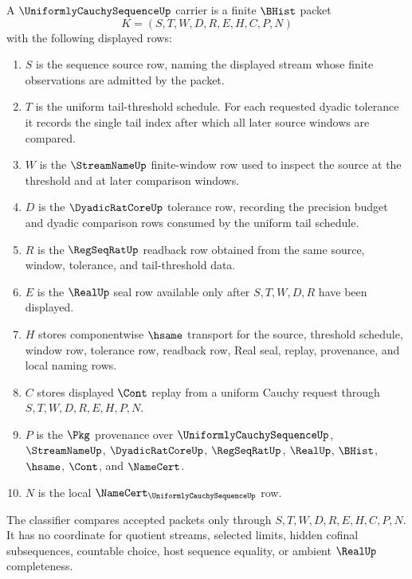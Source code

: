 \begin{definition}
\label{def:uniformly-cauchy-sequence-carrier}
A $\UniformlyCauchySequenceUp$ carrier is a finite $\BHist$ packet
$$
K=(S,T,W,D,R,E,H,C,P,N)
$$
with the following displayed rows:
\begin{enumerate}
\item $S$ is the sequence source row, naming the displayed stream whose finite observations are admitted by the packet.
\item $T$ is the uniform tail-threshold schedule. For each requested dyadic tolerance it records the single tail index after which all later source windows are compared.
\item $W$ is the $\StreamNameUp$ finite-window row used to inspect the source at the threshold and at later comparison windows.
\item $D$ is the $\DyadicRatCoreUp$ tolerance row, recording the precision budget and dyadic comparison rows consumed by the uniform tail schedule.
\item $R$ is the $\RegSeqRatUp$ readback row obtained from the same source, window, tolerance, and tail-threshold data.
\item $E$ is the $\RealUp$ seal row available only after $S,T,W,D,R$ have been displayed.
\item $H$ stores componentwise $\hsame$ transport for the source, threshold schedule, window row, tolerance row, readback row, Real seal, replay, provenance, and local naming rows.
\item $C$ stores displayed $\Cont$ replay from a uniform Cauchy request through $S,T,W,D,R,E,H,P,N$.
\item $P$ is the $\Pkg$ provenance over $\UniformlyCauchySequenceUp$, $\StreamNameUp$, $\DyadicRatCoreUp$, $\RegSeqRatUp$, $\RealUp$, $\BHist$, $\hsame$, $\Cont$, and $\NameCert$.
\item $N$ is the local $\NameCert_{\UniformlyCauchySequenceUp}$ row.
\end{enumerate}
The classifier compares accepted packets only through $S,T,W,D,R,E,H,C,P,N$. It has no coordinate for quotient streams, selected limits, hidden cofinal subsequences, countable choice, host sequence equality, or ambient $\RealUp$ completeness.
\end{definition}

